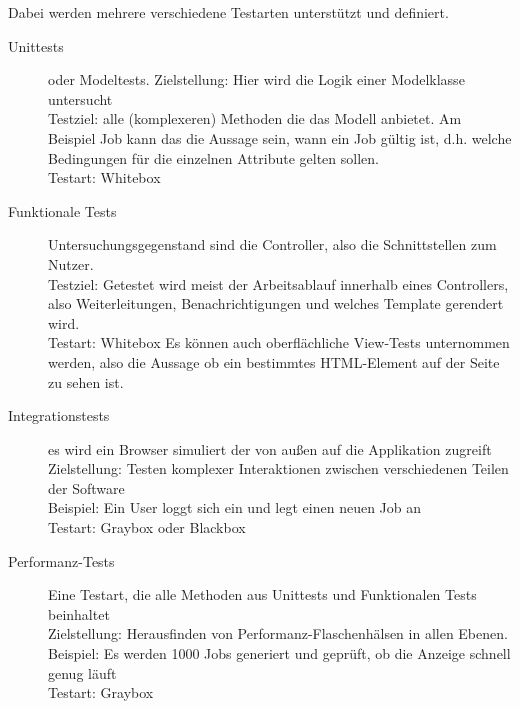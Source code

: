 Dabei werden mehrere verschiedene Testarten unterstützt und definiert.
\begin{description}
 \item[Unittests] oder Modeltests. Zielstellung: Hier wird die Logik einer Modelklasse untersucht\\
 Testziel: alle (komplexeren) Methoden die das Modell anbietet. Am Beispiel Job kann das die Aussage sein, wann ein Job gültig ist, d.h. welche Bedingungen für die einzelnen Attribute gelten sollen.\\
 Testart: Whitebox
 \item[Funktionale Tests] Untersuchungsgegenstand sind die Controller, also die Schnittstellen zum Nutzer. \\
 Testziel: Getestet wird meist der Arbeitsablauf innerhalb eines Controllers, also Weiterleitungen, Benachrichtigungen und welches Template gerendert wird.\\
 Testart: Whitebox
 Es können auch oberflächliche View-Tests unternommen werden, also die Aussage ob ein bestimmtes HTML-Element auf der Seite zu sehen ist.
 \item[Integrationstests] es wird ein Browser simuliert der von außen auf die Applikation zugreift
 Zielstellung: Testen komplexer Interaktionen zwischen verschiedenen Teilen der Software\\
 Beispiel: Ein User loggt sich ein und legt einen neuen Job an\\
 Testart: Graybox oder Blackbox
 \item[Performanz-Tests] Eine Testart, die alle Methoden aus Unittests und Funktionalen Tests beinhaltet\\
 Zielstellung: Herausfinden von Performanz-Flaschenhälsen in allen Ebenen. \\
 Beispiel: Es werden 1000 Jobs generiert und geprüft, ob die Anzeige schnell genug läuft\\
 Testart: Graybox
\end{description}
    




